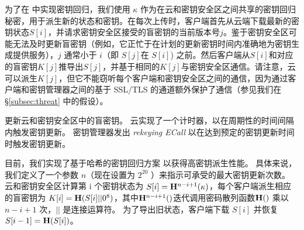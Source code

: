 为了在 \sysname 中实现密钥回归，我们使用 $\kappa$ 作为在云和密钥安全区之间共享的密钥回归秘密，用于派生新的状态和密钥。在每次上传时，客户端首先从云端下载最新的密钥状态$S[i]$，并请求密钥安全区接受的盲密钥的当前版本号$j$。鉴于密钥安全区可能无法及时更新盲密钥（例如，它正忙于在计划的更新密钥时间内准确地为密钥生成提供服务），$j$ 通常小于 $i$（即 $S[j]$在 $S[i]$) 之前。然后客户端从$S[i]$和对应的盲密钥$K[j]$推导出$S[j]$，并基于相同的$K[j]$与密钥安全区通信。请注意，云可以派生$K[j]$，但它不能窃听每个客户端和密钥安全区之间的通信，因为通过客户端和密钥管理器之间的基于 SSL/TLS 的通道额外保护了通信（参见我们在 \S\ref{subsec:threat} 中的假设）。

\sysname 更新云和密钥安全区中的盲密钥。 云实现了一个计时器，以在周期性的时间间隔内触发密钥更新。 密钥管理器发出 \textit{ rekeying ECall} 以在达到预定的密钥更新时间时触发密钥更新。

目前，我们实现了基于哈希的密钥回归方案 \cite{fu06} 以获得高密钥派生性能。 具体来说，我们定义了一个参数 $n$（现在设置为 $2^{20}$ \cite{fu06}）来指示可承受的最大密钥更新次数。 云和密钥安全区计算第 i 个密钥状态为 $S[i] = {\bf H}^{n-i+1}(\kappa)$，每个客户端派生相应的盲密钥为 $K[i] = {\bf H}(S[i] || 0^8)$，其中${\bf H}^{n-i+1}()$迭代调用密码散列函数${ \bf H}()$ 乘以 $n-i+1$ 次，$||$ 是连接运算符。 为了导出旧状态，客户端下载 $S[i]$ 并恢复 $S[i-1] = {\bf H}(S[i])$。
